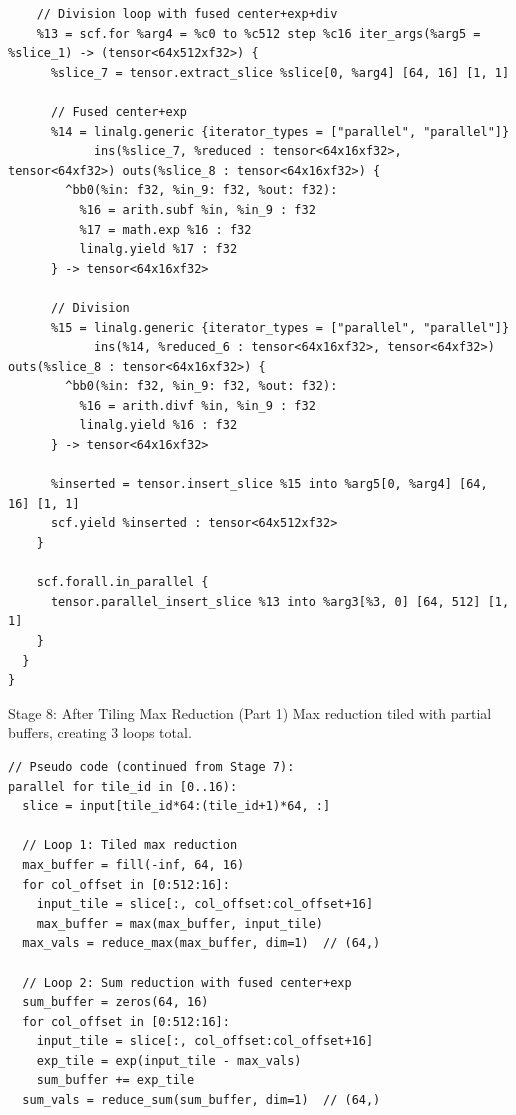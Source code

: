 \documentclass[aspectratio=169]{beamer}
\begin{document}
\begin{lstlisting}
    // Division loop with fused center+exp+div
    %13 = scf.for %arg4 = %c0 to %c512 step %c16 iter_args(%arg5 = %slice_1) -> (tensor<64x512xf32>) {
      %slice_7 = tensor.extract_slice %slice[0, %arg4] [64, 16] [1, 1]

      // Fused center+exp
      %14 = linalg.generic {iterator_types = ["parallel", "parallel"]}
            ins(%slice_7, %reduced : tensor<64x16xf32>, tensor<64xf32>) outs(%slice_8 : tensor<64x16xf32>) {
        ^bb0(%in: f32, %in_9: f32, %out: f32):
          %16 = arith.subf %in, %in_9 : f32
          %17 = math.exp %16 : f32
          linalg.yield %17 : f32
      } -> tensor<64x16xf32>

      // Division
      %15 = linalg.generic {iterator_types = ["parallel", "parallel"]}
            ins(%14, %reduced_6 : tensor<64x16xf32>, tensor<64xf32>) outs(%slice_8 : tensor<64x16xf32>) {
        ^bb0(%in: f32, %in_9: f32, %out: f32):
          %16 = arith.divf %in, %in_9 : f32
          linalg.yield %16 : f32
      } -> tensor<64x16xf32>

      %inserted = tensor.insert_slice %15 into %arg5[0, %arg4] [64, 16] [1, 1]
      scf.yield %inserted : tensor<64x512xf32>
    }

    scf.forall.in_parallel {
      tensor.parallel_insert_slice %13 into %arg3[%3, 0] [64, 512] [1, 1]
    }
  }
}
\end{lstlisting}

\begin{frame}[fragile]{Stage 8: After Tiling Max Reduction (Part 1)}
Max reduction tiled with partial buffers, creating 3 loops total.

\begin{lstlisting}
// Pseudo code (continued from Stage 7):
parallel for tile_id in [0..16):
  slice = input[tile_id*64:(tile_id+1)*64, :]

  // Loop 1: Tiled max reduction
  max_buffer = fill(-inf, 64, 16)
  for col_offset in [0:512:16]:
    input_tile = slice[:, col_offset:col_offset+16]
    max_buffer = max(max_buffer, input_tile)
  max_vals = reduce_max(max_buffer, dim=1)  // (64,)

  // Loop 2: Sum reduction with fused center+exp
  sum_buffer = zeros(64, 16)
  for col_offset in [0:512:16]:
    input_tile = slice[:, col_offset:col_offset+16]
    exp_tile = exp(input_tile - max_vals)
    sum_buffer += exp_tile
  sum_vals = reduce_sum(sum_buffer, dim=1)  // (64,)
\end{lstlisting}
\end{frame}
\end{document}
